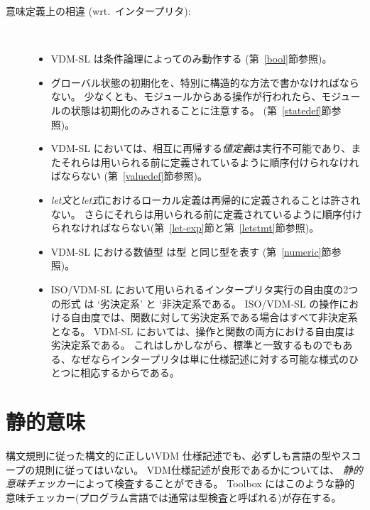 \documentclass[\pformat,12pt]{jarticle}
\newcommand{\vdmslpp}[2]{%
#1
}
\newcommand{\vdmsl}{VDM-SL}
\newcommand{\vdmpp}{VDM++}
\begin{document}
\begin{description}
\begin{itemize}
  \end{itemize}
  
\item[意味定義上の相違 (wrt.\ インタープリタ):]\mbox{}\\[-3mm] 
  \begin{itemize}
  
  \item  \vdmslpp{\vdmsl}{\vdmpp} は条件論理によってのみ動作する (第~\ref{bool}節参照)。
    
  \item グローバル状態の初期化を、特別に構造的な方法で書かなければならない。
    少なくとも、モジュールからある操作が行われたら、モジュールの状態は初期化のみされることに注意する。
    (第~\ref{statedef}節参照)。

  \item  \vdmslpp{\vdmsl}{\vdmpp}においては、相互に再帰する{\it 値定義\/}は実行不可能であり、またそれらは用いられる前に定義されているように順序付けられなければならない (第~\ref{valuedef}節参照)。
    
  \item  {\it let文\/}と{\it  let式\/}におけるローカル定義は再帰的に定義されることは許されない。
さらにそれらは用いられる前に定義されているように順序付けられなければならない(第~\ref{let-exp}節と第~\ref{letstmt}節参照)。 
    
  \item \vdmslpp{\vdmsl}{\vdmpp}における数値型  は型 と同じ型を表す (第~\ref{numeric}節参照)。   
      
  \item   ISO/VDM-SL において用いられるインタープリタ実行の自由度の2つの形式 は `劣決定系' と `非決定系である。 
 ISO/VDM-SL の操作における自由度では、関数に対して劣決定系である場合はすべて非決定系となる。
 \vdmslpp{\vdmsl}{\vdmpp}においては、操作と関数の両方における自由度は劣決定系である。
これはしかしながら、標準と一致するものでもある、なぜならインタープリタは単に仕様記述に対する可能な様式のひとつに相応するからである。

  \end{itemize}
\end{description}

\section{静的意味}\label{static}

構文規則に従った構文的に正しいVDM 仕様記述でも、必ずしも言語の型やスコープの規則に従ってはいない。
VDM仕様記述が良形であるかについては、 {\em 静的意味チェッカー}によって検査することができる。
Toolbox にはこのような静的意味チェッカー(プログラム言語では通常は型検査と呼ばれる)が存在する。
\end{document}
